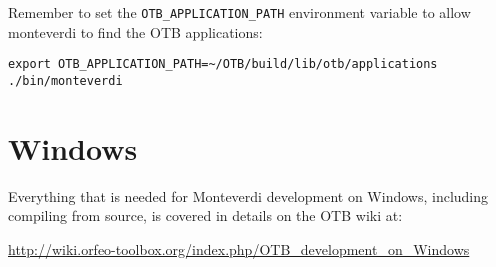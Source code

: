 Remember to set the \texttt{OTB\_APPLICATION\_PATH} environment variable to
allow monteverdi to find the OTB applications:
\begin{verbatim}
export OTB_APPLICATION_PATH=~/OTB/build/lib/otb/applications
./bin/monteverdi
\end{verbatim}

\section{Windows}

Everything that is needed for Monteverdi development on Windows, including compiling from source, is covered in details on the OTB wiki at:
\begin{center}
\url{http://wiki.orfeo-toolbox.org/index.php/OTB_development_on_Windows}
\end{center}
